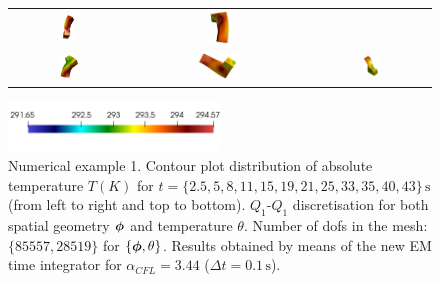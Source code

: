 \begin{figure}[hbtp]
\begin{tabular}{ccc}
		\includegraphics[width=0.12\textwidth]{Figures/Example1/Temperature/TS250v2}&
		\includegraphics[width=0.12\textwidth]{Figures/Example1/Temperature/TS330v2}\\ 				
		\includegraphics[width=0.16\textwidth]{Figures/Example1/Temperature/TS350v2} &
		\includegraphics[width=0.25\textwidth]{Figures/Example1/Temperature/TS400v2} &
		\includegraphics[width=0.13\textwidth]{Figures/Example1/Temperature/TS430v2} 		
	\end{tabular}
	\includegraphics[width=0.5\textwidth]{Figures/Example1/Temperature/TSColorBarv2} 			
	\vspace{-2mm}
	\caption{Numerical example 1. Contour plot distribution of absolute temperature $T(K)$ for $t=\{2.5,5,8,11,15,19,21,25,33,35,40,43\}\,\text{s}$ (from left to right and top to bottom). $Q_1$-$Q_1$ discretisation for both spatial geometry $\boldsymbol{\phi}$ and temperature $\theta$. Number of dofs in the mesh: $\{85557,28519\}$ for $\{\boldsymbol{\phi},\theta\}$. Results obtained by means of the new EM time integrator for $\alpha_{CFL}=3.44$ ($\Delta t = 0.1\,\text{s}$).}
	\label{fig:example 1 temperature}
\end{figure}




